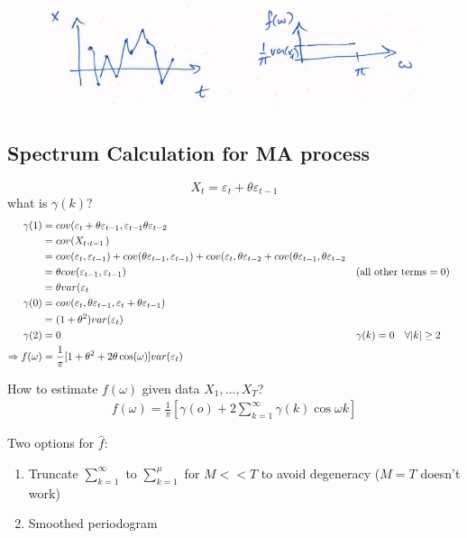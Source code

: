 \begin{figure}[H]
\includegraphics[scale=0.4]{images/Screenshot 2024-04-29 at 08.42.56.jpg}
\centering
\end{figure}



\subsection{Spectrum Calculation for MA process}
\[X_t=\varepsilon_t + \theta \varepsilon_{t-1}\]
what is $\gamma(k)$?
\begin{align*}
    \gamma(1)&=cov(\varepsilon_t+\theta \varepsilon_{t-1}, \varepsilon_{t-1} \theta \varepsilon_{t-2} \\
    &= cov(X_t, _{t-1})\\
    &= cov(\varepsilon_{t}, \varepsilon_{t-1})+cov(\theta \varepsilon_{t-1}, \varepsilon_{t-1}) + cov(\varepsilon_{t}, \theta \varepsilon_{t-2}+cov(\theta \varepsilon_{t-1}, \theta \varepsilon_{t-2}\\
    &= \theta cov(\varepsilon_{t-1},\varepsilon_{t-1}) &&\text{(all other terms $=0$)}\\
    &= \theta var(\varepsilon_{t}\\
    \gamma(0)&= cov(\varepsilon_{t}, \theta \varepsilon_{t-1}, \varepsilon_{t} + \theta \varepsilon_{t-1}) \\
    &= (1+\theta^2)var(\varepsilon_{t}) \\
    \gamma(2)&=0 &&{\gamma(k)=0 \text{\quad} \forall |k|\geq 2 } \\
    \Rightarrow f(\omega) &= \frac{1}{\pi} [ 1 + \theta^2 + 2 \theta \cos(\omega) ]var(\varepsilon_t)
\end{align*}

How to estimate $f(\omega)$ given data $X_1,...,X_T$?
\begin{align*}
    f(\omega) =\frac{1}{\pi} [ \gamma(o) + 2\sum_{k=1}^\infty \gamma(k) \cos \omega k] 
\end{align*}

Two options for $\hat{f}$: 
\begin{enumerate}
    \item Truncate $\sum_{k=1}^\infty$ to $\sum_{k=1}^\mu$ for $M<<T$ to avoid degeneracy ($M=T$ doesn't work)
    \item Smoothed periodogram
\end{enumerate}

